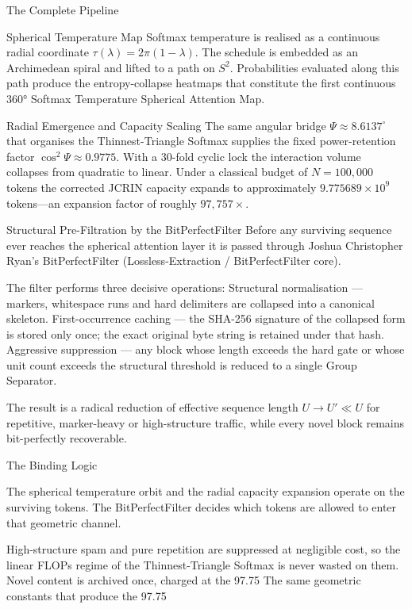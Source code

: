 The Complete Pipeline

Spherical Temperature Map  
   Softmax temperature is realised as a continuous radial coordinate \(\tau(\lambda)=2\pi(1-\lambda)\). The schedule is embedded as an Archimedean spiral and lifted to a path on \(S^2\). Probabilities evaluated along this path produce the entropy-collapse heatmaps that constitute the first continuous 360° Softmax Temperature Spherical Attention Map.

Radial Emergence and Capacity Scaling  
   The same angular bridge \(\Psi\approx8.6137^\circ\) that organises the Thinnest-Triangle Softmax supplies the fixed power-retention factor \(\cos^2\Psi\approx0.9775\). With a 30-fold cyclic lock the interaction volume collapses from quadratic to linear. Under a classical budget of \(N=100{,}000\) tokens the corrected JCRIN capacity expands to approximately \(9.775689\times10^9\) tokens—an expansion factor of roughly \(97{,}757\times\).

Structural Pre-Filtration by the BitPerfectFilter  
   Before any surviving sequence ever reaches the spherical attention layer it is passed through Joshua Christopher Ryan’s BitPerfectFilter (Lossless-Extraction / BitPerfectFilter core).  

   The filter performs three decisive operations:  
   Structural normalisation — markers, whitespace runs and hard delimiters are collapsed into a canonical skeleton.  
   First-occurrence caching — the SHA-256 signature of the collapsed form is stored only once; the exact original byte string is retained under that hash.  
   Aggressive suppression — any block whose length exceeds the hard gate or whose unit count exceeds the structural threshold is reduced to a single Group Separator.  

   The result is a radical reduction of effective sequence length \(U\to U'\ll U\) for repetitive, marker-heavy or high-structure traffic, while every novel block remains bit-perfectly recoverable.

The Binding Logic

The spherical temperature orbit and the radial capacity expansion operate on the surviving tokens. The BitPerfectFilter decides which tokens are allowed to enter that geometric channel.  

High-structure spam and pure repetition are suppressed at negligible cost, so the linear FLOPs regime of the Thinnest-Triangle Softmax is never wasted on them.  
Novel content is archived once, charged at the 97.75 %
The same geometric constants that produce the 97.75 %

